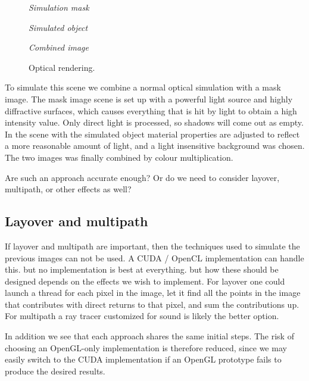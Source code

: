 \documentclass[
   article                                      %
 , 12pt                                         %
 , xelatex                                      %
 , bibtex                                       %
 , layout
]{common/mytemplate}
\begin{document}
\begin{figure}[b]
\begin{minipage}[c]{0.49\linewidth}
\centering\itshape Simulation mask
\end{minipage}\mbox{}\hfill
\begin{minipage}[c]{0.49\linewidth}
\centering\itshape Simulated object
\end{minipage}
\centering\itshape Combined image\vspace{5pt}
\caption{Optical rendering.}\label{s}
\end{figure}

To simulate this scene we combine a normal optical simulation with a mask image. The mask image scene is set up with a powerful light source and highly diffractive surfaces, which causes everything that is hit by light to obtain a high intensity value. Only direct light is processed, so shadows will come out as empty. In the scene with the simulated object material properties are adjusted to reflect a more reasonable amount of light, and a light insensitive background was chosen. The two images was finally combined by colour multiplication.

Are such an approach accurate enough? Or do we need to consider layover, multipath, or other effects as well?


\subsection{Layover and multipath}

If layover and multipath are important, then the techniques used to simulate the previous images can not be used. A CUDA / OpenCL implementation can handle this. but no implementation is best at everything. but how these should be designed depends on the effects we wish to implement. For layover one could launch a thread for each pixel in the image, let it find all the points in the image that contributes with direct returns to that pixel, and sum the contributions up. For multipath a ray tracer customized for sound is likely the better option.


In addition we see that each approach shares the same initial steps. The risk of choosing an OpenGL-only implementation is therefore reduced, since we may easily switch to the CUDA implementation if an OpenGL prototype fails to produce the desired results.
%
\end{document}
